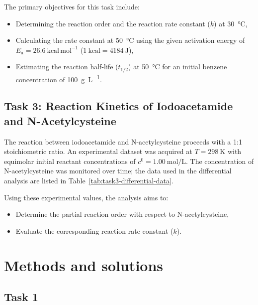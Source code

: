 The primary objectives for this task include:
\begin{itemize}
    \item Determining the reaction order and the reaction rate constant ($k$) at \SI{30}{\degreeCelsius},
    \item Calculating the rate constant at \SI{50}{\degreeCelsius} using the given activation energy of $E_\mathrm{a} = 26.6~\mathrm{kcal\,mol^{-1}}$ ($1~\mathrm{kcal} = \SI{4184}{\joule}$),
    \item Estimating the reaction half-life ($t_{1/2}$) at \SI{50}{\degreeCelsius} for an initial benzene concentration of \SI{100}{\gram\per\liter}.
\end{itemize}

\subsection{Task 3: Reaction Kinetics of Iodoacetamide and N-Acetylcysteine}
The reaction between iodoacetamide and N-acetylcysteine proceeds with a 1:1 stoichiometric ratio. An experimental dataset was acquired at $T = \SI{298}{\kelvin}$ with equimolar initial reactant concentrations of $c^0 = \SI{1.00}{\mole\per\liter}$. The concentration of N-acetylcysteine was monitored over time; the data used
in the differential analysis are listed in Table~\ref{tab:task3-differential-data}.

Using these experimental values, the analysis aims to:
\begin{itemize}
    \item Determine the partial reaction order with respect to N-acetylcysteine,
    \item Evaluate the corresponding reaction rate constant ($k$).
\end{itemize}

\section{Methods and solutions}

\subsection{Task 1}

